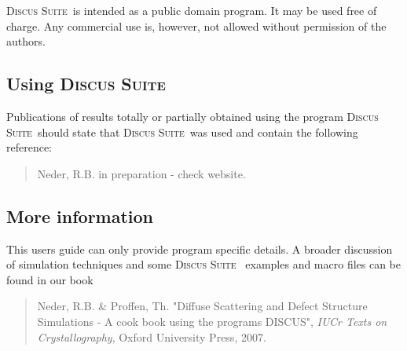 \documentclass[11pt]{report}
\newcommand{\Suite}{\textsc{Discus Suite\ }}
\newcommand{\suite}{\textsc{Discus Suite}}
\begin{document}
\Suite is intended as a public domain program. It may be used free
of charge.  Any commercial use is, however, not allowed without permission
of the authors.


\subsection*{Using \suite}

Publications of results totally or partially obtained using the program
\Suite should state that \Suite was used and contain the
following reference:

\begin{quote}
  {\sc Neder, R.B.} in preparation - check website.
\end{quote}


\subsection*{More information}

This users guide can only provide program specific details. A
broader discussion of simulation techniques and some \Suite
examples and macro files can be found in our book

\begin{quote}
  {\sc Neder, R.B. \& Proffen, Th.} "Diffuse Scattering and Defect Structure
  Simulations - A cook book using the programs DISCUS", {\it IUCr Texts on
  Crystallography}, Oxford University Press, 2007.
\end{quote}


\tableofcontents

%
%






\appendix





\end{document}
